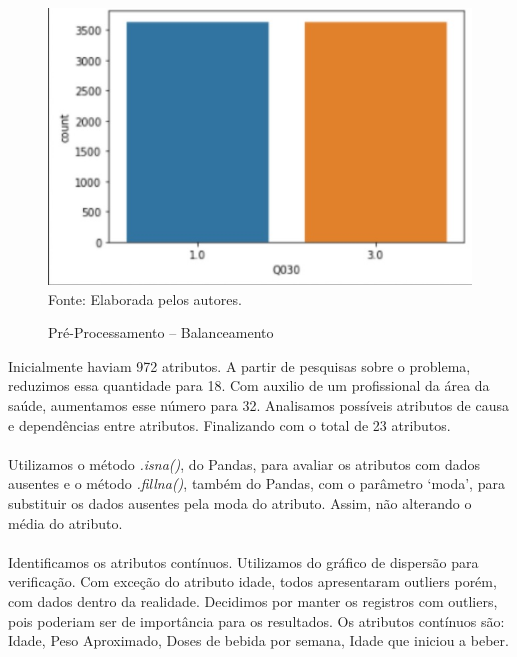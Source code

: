 \documentclass[12pt]{article}
\begin{document}
\begin{figure}[!htb]
    \centering
    \caption{Pré-Processamento – Balanceamento}
    \includegraphics[scale=0.65]{Pre_processamento_balanceamento.jpg}\\
    {\footnotesize Fonte: Elaborada pelos autores.}
    \label{fig:pre_processamento_balanceamento}
\end{figure}

\newpage Inicialmente haviam 972 atributos. A partir de pesquisas sobre o problema, reduzimos essa quantidade para 18. Com auxilio de um profissional da área da saúde, aumentamos esse número para 32. Analisamos possíveis atributos de causa e dependências entre atributos. Finalizando com o total de 23 atributos.\\\\
Utilizamos o método \textit{.isna()}, do Pandas, para avaliar os atributos com dados ausentes e o método \textit{.fillna()}, também do Pandas, com o parâmetro ‘moda’, para substituir os dados ausentes pela moda do atributo. Assim, não alterando o média do atributo.\\\\
Identificamos os atributos contínuos. Utilizamos do gráfico de dispersão para verificação. Com exceção do atributo idade, todos apresentaram outliers porém, com dados dentro da realidade. Decidimos por manter os registros com outliers, pois poderiam ser de importância para os resultados. Os atributos contínuos são: Idade, Peso Aproximado, Doses de bebida por semana, Idade que iniciou a beber.
\end{document}
